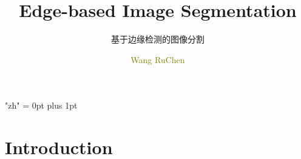 \documentclass[notheorems,serif,table,compress]{beamer}  %
\begin{document}
\XeTeXlinebreaklocale "zh"         %
\XeTeXlinebreakskip = 0pt plus 1pt %
%


\title{Edge-based Image Segmentation}
\subtitle{基于边缘检测的图像分割}
\author[]{\textcolor{olive}{Wang RuChen}}
\date[]{}
\frame{ \titlepage }
\def\hilite<#1>{\temporal<#1>{\color{blue!15}}{\color{black}}{\color{black}}}
\newcommand{\shadow}[2][purple]{\hskip5pt\shadowbox{\color{#1}\small \kai #2\vspace{3mm}}}
\newcommand{\colorrbox}[2][purple]{\doublebox{\color{#1}\small \kai#2}}


\section{Introduction}
\end{document}

